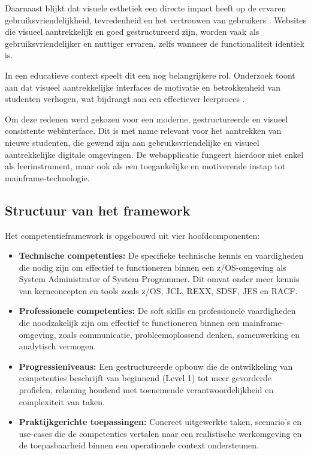 Daarnaast blijkt dat visuele esthetiek een directe impact heeft op de ervaren gebruiksvriendelijkheid, tevredenheid en het vertrouwen van gebruikers \autocite{thielsch2015aesthetics}. Websites die visueel aantrekkelijk en goed gestructureerd zijn, worden vaak als gebruiksvriendelijker en nuttiger ervaren, zelfs wanneer de functionaliteit identiek is.

In een educatieve context speelt dit een nog belangrijkere rol. Onderzoek toont aan dat visueel aantrekkelijke interfaces de motivatie en betrokkenheid van studenten verhogen, wat bijdraagt aan een effectiever leerproces \autocite{mayer2009multimedia}.

Om deze redenen werd gekozen voor een moderne, gestructureerde en visueel consistente webinterface. Dit is met name relevant voor het aantrekken van nieuwe studenten, die gewend zijn aan gebruiksvriendelijke en visueel aantrekkelijke digitale omgevingen. De webapplicatie fungeert hierdoor niet enkel als leerinstrument, maar ook als een toegankelijke en motiverende instap tot mainframe-technologie.


\subsection{Structuur van het framework}

Het competentieframework is opgebouwd uit vier hoofdcomponenten:
\begin{itemize}
	\item \textbf{Technische competenties:} De specifieke technische kennis en vaardigheden die nodig zijn om effectief te functioneren binnen een z/OS-omgeving als System Administrator of System Programmer. Dit omvat onder meer kennis van kernconcepten en tools zoals z/OS, JCL, REXX, SDSF, JES en RACF.
	\item \textbf{Professionele competenties:} De soft skills en professionele vaardigheden die noodzakelijk zijn om effectief te functioneren binnen een mainframe-omgeving, zoals communicatie, probleemoplossend denken, samenwerking en analytisch vermogen.
	\item \textbf{Progressieniveaus:} Een gestructureerde opbouw die de ontwikkeling van competenties beschrijft van beginnend (Level 1) tot meer gevorderde profielen, rekening houdend met toenemende verantwoordelijkheid en complexiteit van taken.
	\item \textbf{Praktijkgerichte toepassingen:} Concreet uitgewerkte taken, scenario’s en use-cases die de competenties vertalen naar een realistische werkomgeving en de toepasbaarheid binnen een operationele context ondersteunen.
\end{itemize}

